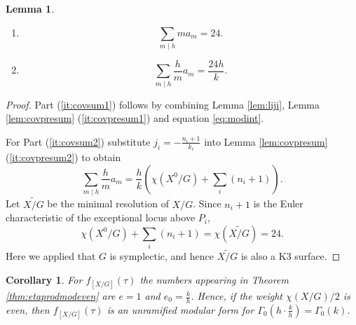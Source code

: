 \documentclass[11pt,a4paper]{amsart}
\newtheorem{lemma}[theorem]{Lemma}
\newtheorem{corollary}[theorem]{Corollary}
\theoremstyle{definition}
\newtheorem{example}[theorem]{Example}
\begin{document}
\begin{lemma}
\label{cor:covsum}
\begin{enumerate}
\item\label{it:covsum1}
\[ \sum_{m \mid h} ma_m=24. \]
\item\label{it:covsum2}
\[ \sum_{m \mid h} \frac{h}{m}a_m=\frac{24h}{k}. \]
\end{enumerate}
\end{lemma}
\begin{proof}
Part (\ref{it:covsum1}) follows by combining Lemma \ref{lem:liji}, Lemma \ref{lem:covpresum} (\ref{it:covpresum1}) and equation \eqref{eq:modint}.

For Part (\ref{it:covsum2}) substitute $j_i=-\frac{n_i+1}{k_i}$ into Lemma \ref{lem:covpresum} (\ref{it:covpresum2}) to obtain
\[ \sum_{m \mid h} \frac{h}{m}a_m= \frac{h}{k}\left( \chi(X^0/G)+\sum_{i}(n_i+1)\right). \]
Let $\widetilde{X/G}$ be the minimal resolution of $X/G$. Since $n_i+1$ is the Euler characteristic of the exceptional locus above $P_i$,
\[  \chi(X^0/G)+\sum_{i}(n_i+1)= \chi(\widetilde{X/G}) =24. \]
Here we applied that $G$ is symplectic, and hence $\widetilde{X/G}$ is also a K3 surface.
\end{proof}
\begin{corollary}
For $f_{[X/G]}(\tau)$ the numbers appearing in Theorem \ref{thm:etaprodmodeven}	are $e=1$ and $e_0=\frac{k}{h}$. Hence, if the weight $\chi(X/G)/2$ is even, then $f_{[X/G]}(\tau)$ is an unramified modular form for $\Gamma_0\left( h \cdot \frac{k}{h} \right)=\Gamma_0(k)$.
\end{corollary}



\end{document}
